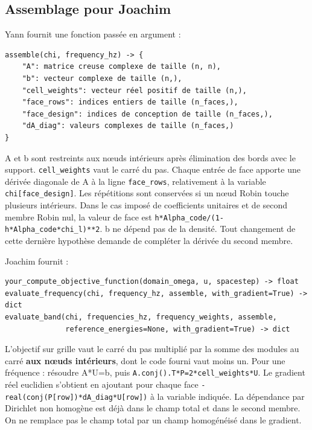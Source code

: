 \documentclass[11pt,a4paper]{article}
\begin{document}
\subsection{Assemblage pour Joachim}

Yann fournit une fonction passée en argument :

\begin{Verbatim}[breaklines,breakanywhere,fontsize=\footnotesize]
assemble(chi, frequency_hz) -> {
    "A": matrice creuse complexe de taille (n, n),
    "b": vecteur complexe de taille (n,),
    "cell_weights": vecteur réel positif de taille (n,),
    "face_rows": indices entiers de taille (n_faces,),
    "face_design": indices de conception de taille (n_faces,),
    "dA_diag": valeurs complexes de taille (n_faces,)
}
\end{Verbatim}

{\small\ttfamily A} et {\small\ttfamily b} sont restreints aux nœuds intérieurs après élimination des bords avec le support. {\small\ttfamily \nolinkurl{cell_weights}} vaut le carré du pas. Chaque entrée de face apporte une dérivée diagonale de {\small\ttfamily A} à la ligne {\small\ttfamily \nolinkurl{face_rows}}, relativement à la variable {\small\ttfamily \nolinkurl{chi[face_design]}}. Les répétitions sont conservées si un nœud Robin touche plusieurs intérieurs. Dans le cas imposé de coefficients unitaires et de second membre Robin nul, la valeur de face est {\small\ttfamily \nolinkurl{h*Alpha_code/(1-h*Alpha_code*chi_l)**2}}. {\small\ttfamily b} ne dépend pas de la densité. Tout changement de cette dernière hypothèse demande de compléter la dérivée du second membre.

Joachim fournit :

\begin{Verbatim}[breaklines,breakanywhere,fontsize=\footnotesize]
your_compute_objective_function(domain_omega, u, spacestep) -> float
evaluate_frequency(chi, frequency_hz, assemble, with_gradient=True) -> dict
evaluate_band(chi, frequencies_hz, frequency_weights, assemble,
              reference_energies=None, with_gradient=True) -> dict
\end{Verbatim}

L'objectif sur grille vaut le carré du pas multiplié par la somme des modules au carré \textbf{aux nœuds intérieurs}, dont le code fourni vaut moins un. Pour une fréquence : résoudre {\small\ttfamily A*U=b}, puis {\small\ttfamily \nolinkurl{A.conj().T*P=2*cell_weights*U}}. Le gradient réel euclidien s'obtient en ajoutant pour chaque face {\small\ttfamily \nolinkurl{-real(conj(P[row])*dA_diag*U[row])}} à la variable indiquée. La dépendance par Dirichlet non homogène est déjà dans le champ total et dans le second membre. On ne remplace pas le champ total par un champ homogénéisé dans le gradient.
\end{document}
